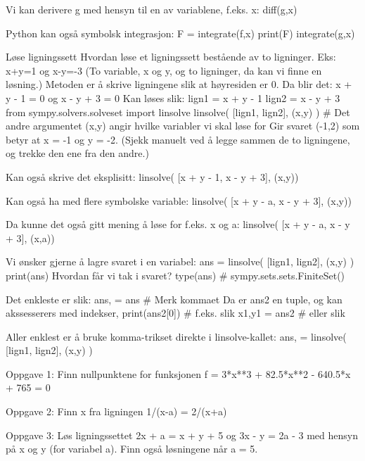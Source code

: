 Vi kan derivere g med hensyn til en av variablene, f.eks. x:
diff(g,x)


Python kan også symbolsk integrasjon:
F = integrate(f,x) 
print(F)
integrate(g,x)




Løse ligningssett 
Hvordan løse et ligningssett bestående av to ligninger.
Eks: x+y=1 og x-y=-3
(To variable, x og y, og to ligninger, da kan vi finne en løsning.)
Metoden er å skrive ligningene slik at høyresiden er 0.
Da blir det:
x + y - 1 = 0  og  x - y + 3 = 0
Kan løses slik:
lign1 = x + y - 1
lign2 = x - y + 3
from sympy.solvers.solveset import linsolve
linsolve( [lign1, lign2], (x,y) )     # Det andre argumentet (x,y) angir hvilke variabler vi skal løse for
Gir svaret {(-1,2)} som betyr at x = -1 og y = -2.
(Sjekk manuelt ved å legge sammen de to ligningene, og trekke den ene fra den andre.) 

Kan også skrive det eksplisitt:
linsolve( [x + y - 1, x - y + 3], (x,y))

Kan også ha med flere symbolske variable: 
linsolve( [x + y - a, x - y + 3], (x,y))

Da kunne det også gitt mening å løse for f.eks. x og a:
linsolve( [x + y - a, x - y + 3], (x,a))



Vi ønsker gjerne å lagre svaret i en variabel:
ans = linsolve( [lign1, lign2], (x,y) )  
print(ans)
Hvordan får vi tak i svaret?
type(ans)     # sympy.sets.sets.FiniteSet()

Det enkleste er slik:
ans, = ans    # Merk kommaet
Da er ans2 en tuple, og kan akssesserers med indekser,
print(ans2[0])  # f.eks. slik
x1,y1 = ans2    # eller slik 

Aller enklest er å bruke komma-trikset direkte i linsolve-kallet: 
ans, = linsolve( [lign1, lign2], (x,y) )  



Oppgave 1: Finn nullpunktene for funksjonen f = 3*x**3 + 82.5*x**2 - 640.5*x + 765 = 0


Oppgave 2: Finn x fra ligningen   1/(x-a) = 2/(x+a)


Oppgave 3: Løs ligningssettet 2x + a = x + y + 5  og  3x - y = 2a - 3  med hensyn på x og y (for variabel a).
Finn også løsningene når a = 5. 


